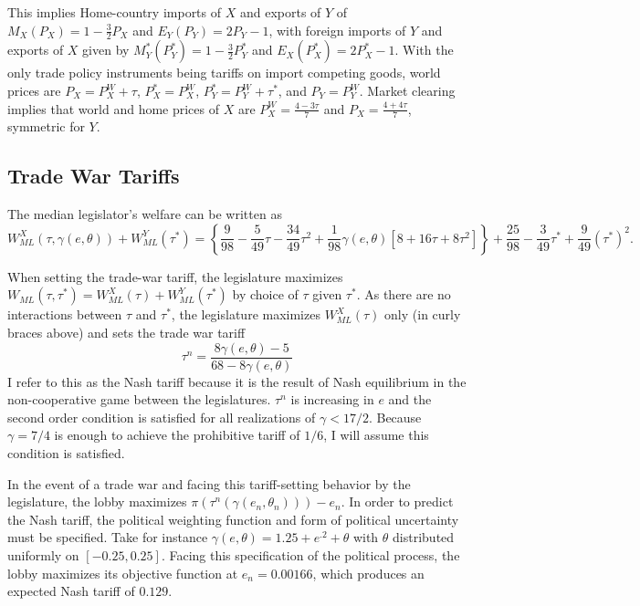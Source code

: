 \documentclass[10pt]{article}
\newcommand{\ve}{\theta}
\newcommand{\ta}{\theta}
\newcommand{\ga}{\gamma}
\begin{document}
This implies Home-country imports of $X$ and exports of $Y$ of $M_X(P_X)= 1 - \frac{3}{2}P_X$ and $E_Y(P_Y)= 2P_Y -1$, with foreign imports of $Y$ and exports of $X$ given by $M_Y^*(P_Y^*)= 1 - \frac{3}{2}P_Y^*$ and $E_X(P_X^*)= 2P_X^* -1$. With the only trade policy instruments being tariffs on import competing goods, world prices are $P_X = P_X^W + \tau$, $P_X^* = P_X^W$, $P_Y^* = P_Y^W + \tau^*$, and $P_Y = P_Y^W$. Market clearing implies that world and home prices of $X$ are $P_X^W = \frac{4-3\tau}{7}$ and $P_X = \frac{4+4\tau}{7}$, symmetric for $Y$. \\

\subsection{Trade War Tariffs}
The median legislator's welfare can be written as 
\[
  W_{\mathit{ML}}^X(\tau,\ga(e,\ve)) + W_{\mathit{ML}}^Y(\tau^*) = \left\{\frac{9}{98} - \frac{5}{49}\tau - \frac{34}{49}\tau^2 +\frac{1}{98}\ga(e,\ve)\left[ 8 + 16\tau + 8\tau^2 \right] \right\}+ \frac{25}{98} - \frac{3}{49}\tau^* + \frac{9}{49}(\tau^*)^2.
\]

When setting the trade-war tariff, the legislature maximizes $W_{\mathit{ML}}(\tau, \tau^*) = W_{\mathit{ML}}^X(\tau) + W_{\mathit{ML}}^Y(\tau^*)$ by choice of $\tau$ given $\tau^*$. As there are no interactions between $\tau$ and $\tau^*$, the legislature maximizes $W_{\mathit{ML}}^X(\tau)$ only (in curly braces above) and sets the trade war tariff
\[
  \tau^n = \frac{8\ga(e,\ve)-5}{68-8\ga(e,\ve)}
\]
I refer to this as the Nash tariff because it is the result of Nash equilibrium in the non-cooperative game between the legislatures. $\tau^n$ is increasing in $e$ and the second order condition is satisfied for all realizations of $\ga < 17/2$. Because $\ga = 7/4$ is enough to achieve the prohibitive tariff of $1/6$, I will assume this condition is satisfied. 

In the event of a trade war and facing this tariff-setting behavior by the legislature, the lobby maximizes $\pi\left(\tau^n\left(\ga\left(e_n,\ve_n\right)\right)\right) - e_n$. In order to predict the Nash tariff, the political weighting function and form of political uncertainty must be specified. Take for instance $\ga(e,\ve) = 1.25 + e^{.2} + \ta$ with $\ve$ distributed uniformly on $[-0.25,0.25]$. Facing this specification of the political process, the lobby maximizes its objective function at $e_n = 0.00166$, which produces an expected Nash tariff of $0.129$.
\end{document}
